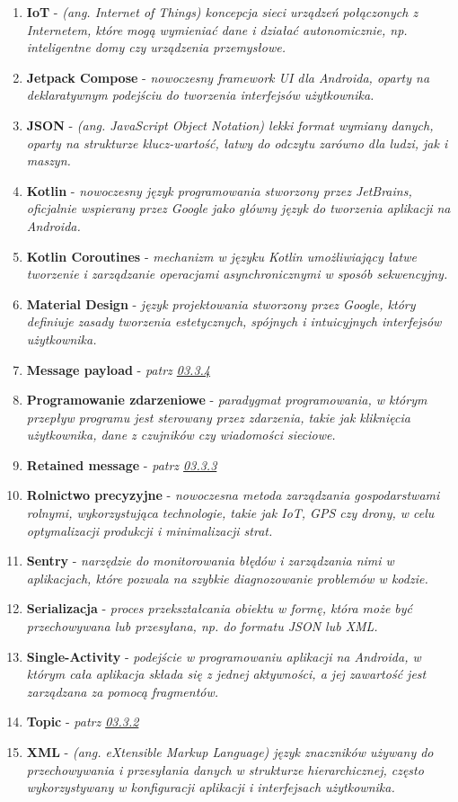 \begin{enumerate}[leftmargin=*]
\item \textbf{IoT} - \textit{(ang. Internet of Things) koncepcja sieci urządzeń połączonych z Internetem, które mogą wymieniać dane i działać autonomicznie, np. inteligentne domy czy urządzenia przemysłowe.}
\item \textbf{Jetpack Compose} - \textit{nowoczesny framework UI dla Androida, oparty na deklaratywnym podejściu do tworzenia interfejsów użytkownika.}
\item \textbf{JSON} - \textit{(ang. JavaScript Object Notation) lekki format wymiany danych, oparty na strukturze klucz-wartość, łatwy do odczytu zarówno dla ludzi, jak i maszyn.}
\item \textbf{Kotlin} - \textit{nowoczesny język programowania stworzony przez JetBrains, oficjalnie wspierany przez Google jako główny język do tworzenia aplikacji na Androida.}
\item \textbf{Kotlin Coroutines} - \textit{mechanizm w języku Kotlin umożliwiający łatwe tworzenie i zarządzanie operacjami asynchronicznymi w sposób sekwencyjny.}
\item \textbf{Material Design} - \textit{język projektowania stworzony przez Google, który definiuje zasady tworzenia estetycznych, spójnych i intuicyjnych interfejsów użytkownika.}
\item \textbf{Message payload} - \textit{patrz \hyperlink{03.3.4}{03.3.4}}
\item \textbf{Programowanie zdarzeniowe} - \textit{paradygmat programowania, w którym przepływ programu jest sterowany przez zdarzenia, takie jak kliknięcia użytkownika, dane z czujników czy wiadomości sieciowe.}
\item \textbf{Retained message} - \textit{patrz \hyperlink{03.3.3}{03.3.3}}
\item \textbf{Rolnictwo precyzyjne} - \textit{nowoczesna metoda zarządzania gospodarstwami rolnymi, wykorzystująca technologie, takie jak IoT, GPS czy drony, w celu optymalizacji produkcji i minimalizacji strat.}
\item \textbf{Sentry} - \textit{narzędzie do monitorowania błędów i zarządzania nimi w aplikacjach, które pozwala na szybkie diagnozowanie problemów w kodzie.}
\item \textbf{Serializacja} - \textit{proces przekształcania obiektu w formę, która może być przechowywana lub przesyłana, np. do formatu JSON lub XML.}
\item \textbf{Single-Activity} - \textit{podejście w programowaniu aplikacji na Androida, w którym cała aplikacja składa się z jednej aktywności, a jej zawartość jest zarządzana za pomocą fragmentów.}
\item \textbf{Topic} - \textit{patrz \hyperlink{03.3.2}{03.3.2}}
\item \textbf{XML} - \textit{(ang. eXtensible Markup Language) język znaczników używany do przechowywania i przesyłania danych w strukturze hierarchicznej, często wykorzystywany w konfiguracji aplikacji i interfejsach użytkownika.}
\end{enumerate}